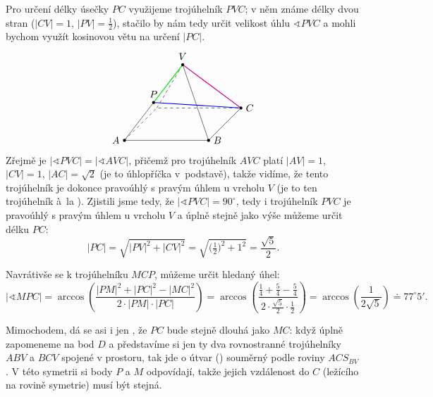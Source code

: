 \documentclass[10pt,a4paper]{article}
\begin{document}
Pro určení délky úsečky $PC$ využijeme trojúhelník $PVC$; v něm známe délky dvou stran ($|CV| = 1$, $|PV| = \frac12$), stačilo by nám tedy určit velikost úhlu $\sphericalangle PVC$ a mohli bychom využít kosinovou větu na určení $|PC|$.
\[\begin{tikzpicture}[scale=3]
\zaklad
\draw[blue,thick] (C) -- (P);
\draw[green,thick] (V) -- (P);
\draw[magenta,thick] (V) -- (C);
\end{tikzpicture}\]
Zřejmě je $|\sphericalangle PVC| = |\sphericalangle AVC|$, přičemž pro trojúhelník $AVC$ platí $|AV| = 1$, $|CV| = 1$, $|AC| = \sqrt{2}$ (je to úhlopříčka v~podstavě), takže vidíme, že tento trojúhelník je dokonce pravoúhlý s pravým úhlem u vrcholu $V$ (je to ten trojúhelník à~la ). Zjistili jsme tedy, že $|\sphericalangle PVC| = 90^\circ$, tedy i trojúhelník $PVC$ je pravoúhlý s pravým úhlem u vrcholu $V$ a úplně stejně jako výše můžeme určit délku $PC$:
\[ |PC| = \sqrt{|PV|^2 + |CV|^2} = \sqrt{\bigl(\tfrac12\bigr)^2 + 1^2} = \frac{\sqrt5}{2}. \]

Navrátivše se k trojúhelníku $MCP$, můžeme určit hledaný úhel:
\[ |\sphericalangle MPC| = \arccos \left( \frac{|PM|^2 + |PC|^2 - |MC|^2}{2 \cdot |PM| \cdot |PC|} \right)
 = \arccos \left( \frac{\frac14 + \frac54 - \frac54}{2 \cdot \frac{\sqrt{5}}2 \cdot \frac12} \right)
= \arccos \left( \frac{1}{2\sqrt5} \right) \doteq 77^\circ 5'.
 \]

\bigskip

Mimochodem, dá se asi i jen , že $PC$ bude stejně dlouhá jako $MC$: když úplně zapomeneme na bod $D$ a představíme si jen ty dva rovnostranné trojúhelníky $ABV$ a $BCV$ spojené v prostoru, tak jde o útvar () souměrný podle roviny $ACS_{BV}$. V této symetrii si body $P$ a $M$ odpovídají, takže jejich vzdálenost do $C$ (ležícího na rovině symetrie) musí být stejná.
\end{document}

